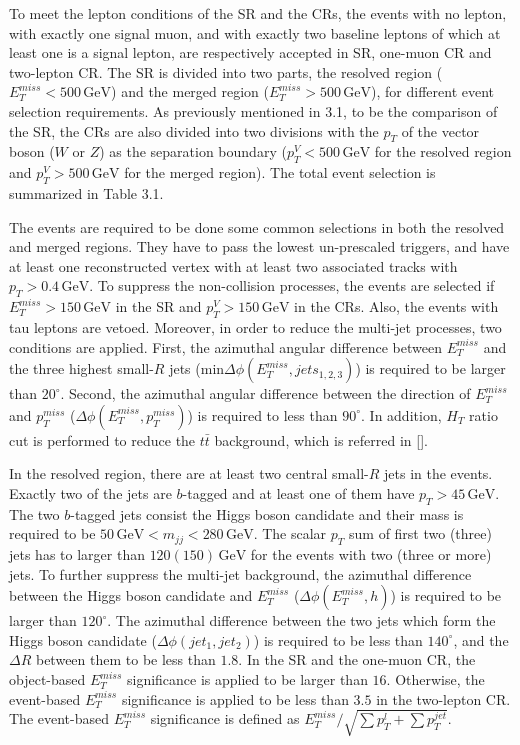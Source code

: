 \documentclass[class=NTHU_thesis, crop=false]{standalone}
\begin{document}
To meet the lepton conditions of the SR and the CRs, the events with no lepton, with exactly one signal muon, and with exactly two baseline leptons of which at least one is a signal lepton, are respectively accepted in SR, one-muon CR and two-lepton CR. The SR is divided into two parts, the resolved region ($E^{miss}_T < 500\, \mathrm{GeV}$) and the merged region ($E^{miss}_T > 500\, \mathrm{GeV}$), for different event selection requirements. As previously mentioned in 3.1, to be the comparison of the SR, the CRs are also divided into two divisions with the $p_T$ of the vector boson ($W$ or $Z$) as the separation boundary ($p^V_T < 500\, \mathrm{GeV}$ for the resolved region and $p^V_T > 500\, \mathrm{GeV}$ for the merged region). The total event selection is summarized in Table 3.1.

The events are required to be done some common selections in both the resolved and merged regions. They have to pass the lowest un-prescaled triggers, and have at least one reconstructed vertex with at least two associated tracks with $p_T > 0.4\, \mathrm{GeV}$. To suppress the non-collision processes, the events are selected if $E^{miss}_T > 150\, \mathrm{GeV}$ in the SR and $p^V_T > 150\, \mathrm{GeV}$ in the CRs. Also, the events with tau leptons are vetoed. Moreover, in order to reduce the multi-jet processes, two conditions are applied. First, the azimuthal angular difference between $E^{miss}_T$ and the three highest small-$R$ jets (min$\Delta\phi(E^{miss}_T, jets_{1, 2, 3})$) is required to be larger than $20^\circ$. Second, the azimuthal angular difference between the direction of $E^{miss}_T$ and $p^{miss}_T$ ($\Delta\phi(E^{miss}_T, p^{miss}_T)$) is required to less than $90^\circ$. In addition, $H_T$ ratio cut is performed to reduce the $t\bar{t}$ background, which is referred in [].

In the resolved region, there are at least two central small-$R$ jets in the events. Exactly two of the jets are $b$-tagged and at least one of them have $p_T > 45\, \mathrm{GeV}$. The two $b$-tagged jets consist the Higgs boson candidate and their mass is required to be $50\, \mathrm{GeV} < m_{jj} < 280\, \mathrm{GeV}$. The scalar $p_T$ sum of first two (three) jets has to larger than $120 (150)\, \mathrm{GeV}$ for the events with two (three or more) jets. To further suppress the multi-jet background, the azimuthal difference between the Higgs boson candidate and $E^{miss}_T$ ($\Delta\phi(E^{miss}_T, h)$) is required to be larger than $120^\circ$. The azimuthal difference between the two jets which form the Higgs boson candidate ($\Delta\phi(jet_1, jet_2)$) is required to be less than $140^\circ$, and the ${\Delta}R$ between them to be less than $1.8$. In the SR and the one-muon CR, the object-based $E^{miss}_T$ significance is applied to be larger than $16$. Otherwise, the event-based $E^{miss}_T$ significance is applied to be less than $3.5$ in the two-lepton CR. The event-based $E^{miss}_T$ significance is defined as $E^{miss}_T/\sqrt{{\sum}p^l_T+{\sum}p^{jet}_T}$.
\end{document}

